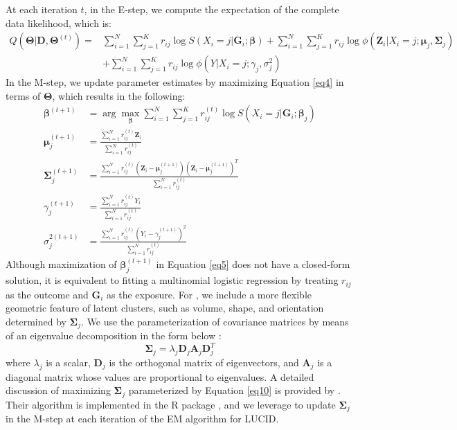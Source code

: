 At each iteration $t$, in the E-step, we compute the expectation of the complete data likelihood, which is:
\begin{equation}
    \begin{aligned}
        Q(\bm{\Theta}|\bm{D}, \bm{\Theta}^{(t)}) = & \sum_{i=1}^N\sum_{j=1}^K r_{ij} \log S\left(X_i = j|\bm{G}_i;\bm{\beta}\right) + \sum_{i=1}^N\sum_{j=1}^K r_{ij} \log \phi(\bm{Z}_i|X_i = j;\bm{\mu}_j, \bm{\Sigma}_j) \\
        & + \sum_{i=1}^N\sum_{j=1}^K r_{ij} \log \phi\left(Y|X_i = j; \gamma_j, \sigma_j^2\right)
    \end{aligned}
    \label{eq4}
\end{equation}
In the M-step, we update parameter estimates by maximizing Equation \ref{eq4} in terms of $\bm \Theta$, which results in the following:
\begin{align}
    \bm \beta^{(t+1)} & = \arg \max_{\bm \beta} \sum_{i=1}^N \sum_{j=1}^K r_{ij}^{(t)} \log S(X_i = j| \bm G_i; \bm \beta_j) \label{eq5} \\
    \bm \mu_j^{(t+1)} & = \frac{\sum_{i=1}^N r_{ij}^{(t)}\bm Z_i}{\sum_{i=1}^N r_{ij}^{(t)}} \label{eq6} \\
    \bm \Sigma_j^{(t+1)} & = \frac{\sum_{i=1}^N r_{ij}^{(t)} \left(\bm{Z}_i - \bm{\mu}_j^{(t+1)} \right) \left(\bm{Z}_i - \bm{\mu}_j^{(t+1)} \right)^T}{\sum_{i=1}^N r_{ij}^{(t)}} \label{eq7} \\
    \gamma_j^{(t+1)} & = \frac{\sum_{i=1}^N r_{ij}^{(t)}Y_i}{\sum_{i=1}^N r_{ij}^{(t)}} \label{eq8} \\
    \sigma_j^{2(t+1)} & = \frac{\sum_{i=1}^N r_{ij}^{(t)} \left(Y_i - \gamma_j^{(t+1)} \right)^2}{\sum_{i=1}^N r_{ij}^{(t)}} \label{eq9}
\end{align}
Although maximization of $\bm \beta_j^{(t+1)}$ in Equation \ref{eq5} does not have a closed-form solution, it is equivalent to fitting a multinomial logistic regression by treating $r_{ij}$ as the outcome and $\bm G_i$ as the exposure.
For , we include a more flexible geometric feature of latent clusters, such as volume, shape, and orientation determined by $\bm \Sigma_j$. We use the parameterization of covariance matrices by means of an eigenvalue decomposition in the form below \citep{banfield1993model}:
\begin{equation}
    \boldsymbol{\Sigma}_j = \lambda_j \boldsymbol{D}_j  \boldsymbol{A}_j \boldsymbol{D}_j^T \label{eq10}
\end{equation}
where $\lambda_j$ is a scalar, $\bm D_j$ is the orthogonal matrix of eigenvectors, and $\bm A_j$ is a diagonal matrix whose values are proportional to eigenvalues. A detailed discussion of maximizing $\bm \Sigma_j$ parameterized by Equation \ref{eq10} is provided by \citet{celeux1995gaussian}. Their algorithm is implemented in the R package  \citep{scrucca2016mclust}, and we leverage  to update $\bm \Sigma_j$ in the M-step at each iteration of the EM algorithm for LUCID.
